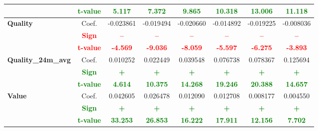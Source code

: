 \documentclass[11pt,english,a4paper,hidelinks]{book}
\begin{document}
\begin{table}[H]
\begin{tabular}{lccccccc}
            & \textbf{\textcolor{green}{t-value}} & \textbf{\textcolor{green}{5.117}}     & \textbf{\textcolor{green}{7.372}}     & \textbf{\textcolor{green}{9.865}}     & \textbf{\textcolor{green}{10.318}}    & \textbf{\textcolor{green}{13.006}}    & \textbf{\textcolor{green}{11.118}}    \\
        \midrule
        \multirow{3}{*}{\textbf{Quality}}
            & Coef.   & -0.023861 & -0.019494 & -0.020660 & -0.014892 & -0.019225 & -0.008036 \\
            & \textbf{\textcolor{red}{Sign}}    & \textbf{\textcolor{red}{–}}         & \textbf{\textcolor{red}{–}}         & \textbf{\textcolor{red}{–}}         & \textbf{\textcolor{red}{–}}         & \textbf{\textcolor{red}{–}}         & \textbf{\textcolor{red}{–}}         \\
            & \textbf{\textcolor{red}{t-value}} & \textbf{\textcolor{red}{-4.569}}    & \textbf{\textcolor{red}{-9.036}}    & \textbf{\textcolor{red}{-8.059}}    & \textbf{\textcolor{red}{-5.597}}    & \textbf{\textcolor{red}{-6.275}}    & \textbf{\textcolor{red}{-3.893}}    \\
        \multirow{3}{*}{\textbf{Quality\_24m\_avg}}
            & Coef.   & 0.010252 & 0.022449 & 0.039548 & 0.076738 & 0.078367 & 0.125694 \\
            & \textbf{\textcolor{green}{Sign}}    & \textbf{\textcolor{green}{+}}        & \textbf{\textcolor{green}{+}}        & \textbf{\textcolor{green}{+}}        & \textbf{\textcolor{green}{+}}        & \textbf{\textcolor{green}{+}}        & \textbf{\textcolor{green}{+}}        \\
            & \textbf{\textcolor{green}{t-value}} & \textbf{\textcolor{green}{4.614}}    & \textbf{\textcolor{green}{10.375}}   & \textbf{\textcolor{green}{14.268}}   & \textbf{\textcolor{green}{19.246}}   & \textbf{\textcolor{green}{20.388}}   & \textbf{\textcolor{green}{14.657}}   \\
        \midrule
        \multirow{3}{*}{\textbf{Value}}
            & Coef.   & 0.042605  & 0.026478  & 0.012090  & 0.012708  & 0.008177  & 0.004550  \\
            & \textbf{\textcolor{green}{Sign}}    & \textbf{\textcolor{green}{+}}        & \textbf{\textcolor{green}{+}}        & \textbf{\textcolor{green}{+}}        & \textbf{\textcolor{green}{+}}        & \textbf{\textcolor{green}{+}}        & \textbf{\textcolor{green}{+}}        \\
            & \textbf{\textcolor{green}{t-value}} & \textbf{\textcolor{green}{33.253}}   & \textbf{\textcolor{green}{26.853}}   & \textbf{\textcolor{green}{16.222}}   & \textbf{\textcolor{green}{17.911}}   & \textbf{\textcolor{green}{12.156}}   & \textbf{\textcolor{green}{7.702}}    \\

\end{tabular}
\end{table}
\end{document}
